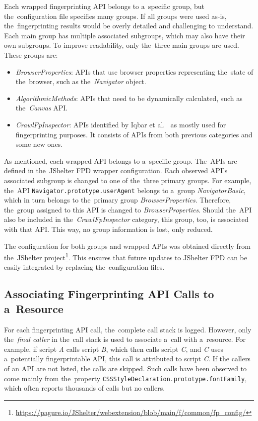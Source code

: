 Each wrapped fingerprinting API belongs to a~specific group, but the~configuration file specifies many groups. If all groups were used as-is, the~fingerprinting results would be overly detailed and challenging to understand. Each main group has multiple associated subgroups, which may also have their own subgroups. To improve readability, only the~three main groups are used. These groups are:

\begin{itemize}
\setlength\itemsep{0em}
    \item  \textit{BrowserProperties}: APIs that use browser properties representing the~state of \linebreak the~browser, such as the~\textit{Navigator} object.
    \item \textit{AlgorithmicMethods}: APIs that need to be dynamically calculated, such as the~\textit{Canvas} API.
    \item \textit{CrawlFpInspector}: APIs identified by Iqbar et al.~\cite{iqbal2020fingerprintingfingerprinterslearningdetect} as mostly used for fingerprinting purposes. It consists of APIs from both previous categories and some new ones.
\end{itemize}

As mentioned, each wrapped API belongs to a~specific group. The~APIs are defined in the~JShelter FPD wrapper configuration. Each observed API's associated subgroup is changed to one of the~three primary groups. For example, the~API \texttt{Navigator.prototype.{\linebreak}userAgent} belongs to a~group \textit{NavigatorBasic}, which in turn belongs to the~primary group \textit{BrowserProperties}. Therefore, the~group assigned to this API is changed to \textit{BrowserProperties}. Should the~API also be included in the~\textit{CrawlFpInspector} category, this group, too, is associated with that API. This way, no group information is lost, only reduced.

The configuration for both groups and wrapped APIs was obtained directly from \linebreak the~JShelter project\footnote{\url{https://pagure.io/JShelter/webextension/blob/main/f/common/fp_config/}}. This ensures that future updates to JShelter FPD can be easily integrated by replacing the~configuration files. 

\subsection{Associating Fingerprinting API Calls to a~Resource}
\label{associating-fp-attempts}
For each fingerprinting API call, the~complete call stack is logged. However, only the~\emph{final caller} in the~call stack is used to associate a~call with a~resource. For example, if script \emph{A} calls script \emph{B}, which then calls script \emph{C}, and \emph{C} uses a~potentially fingerprintable API, this call is attributed to script \emph{C}. If the callers of an API are not listed, the calls are skipped. Such calls have been observed to come mainly from the~property \texttt{CSSStyleDeclaration.prototype.fontFamily}, which often reports thousands of calls but no callers.

